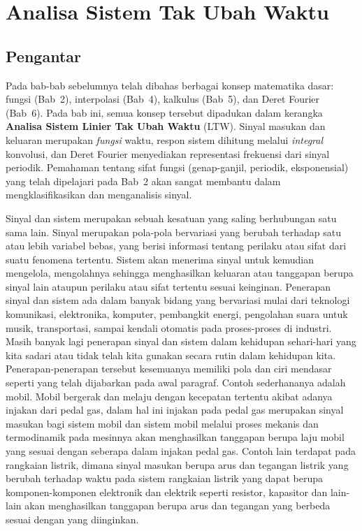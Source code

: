 \chapter{Analisa Sistem Tak Ubah Waktu}

\section*{Pengantar}
Pada bab-bab sebelumnya telah dibahas berbagai konsep matematika dasar: fungsi (Bab~2), interpolasi (Bab~4), kalkulus (Bab~5), dan Deret Fourier (Bab~6). Pada bab ini, semua konsep tersebut dipadukan dalam kerangka \textbf{Analisa Sistem Linier Tak Ubah Waktu} (LTW). Sinyal masukan dan keluaran merupakan \textit{fungsi} waktu, respon sistem dihitung melalui \textit{integral} konvolusi, dan Deret Fourier menyediakan representasi frekuensi dari sinyal periodik. Pemahaman tentang sifat fungsi (genap-ganjil, periodik, eksponensial) yang telah dipelajari pada Bab~2 akan sangat membantu dalam mengklasifikasikan dan menganalisis sinyal.

Sinyal dan sistem merupakan sebuah kesatuan yang saling berhubungan satu sama lain. Sinyal merupakan pola-pola bervariasi yang berubah terhadap satu atau lebih variabel bebas, yang berisi informasi tentang perilaku atau sifat dari suatu fenomena tertentu. Sistem akan menerima sinyal untuk kemudian mengelola, mengolahnya sehingga menghasilkan keluaran atau tanggapan berupa sinyal lain ataupun perilaku atau sifat tertentu sesuai keinginan. Penerapan sinyal dan sistem ada dalam banyak bidang yang bervariasi mulai dari teknologi komunikasi, elektronika, komputer, pembangkit energi, pengolahan suara untuk musik, transportasi, sampai kendali otomatis pada proses-proses di industri. Masih banyak lagi penerapan sinyal dan sistem dalam kehidupan sehari-hari yang kita sadari atau tidak telah kita gunakan secara rutin dalam kehidupan kita. Penerapan-penerapan tersebut kesemuanya memiliki pola dan ciri mendasar seperti yang telah dijabarkan pada awal paragraf. Contoh sederhananya adalah mobil. Mobil bergerak dan melaju dengan kecepatan tertentu akibat adanya injakan dari pedal gas, dalam hal ini injakan pada pedal gas merupakan sinyal masukan bagi sistem mobil dan sistem mobil melalui proses mekanis dan termodinamik pada mesinnya akan menghasilkan tanggapan berupa laju mobil yang sesuai dengan seberapa dalam injakan pedal gas. Contoh lain terdapat pada rangkaian listrik, dimana sinyal masukan berupa arus dan tegangan listrik yang berubah terhadap waktu pada sistem rangkaian listrik yang dapat berupa komponen-komponen elektronik dan elektrik seperti resistor, kapasitor dan lain-lain akan menghasilkan tanggapan berupa arus dan tegangan yang berbeda sesuai dengan yang diinginkan. 

